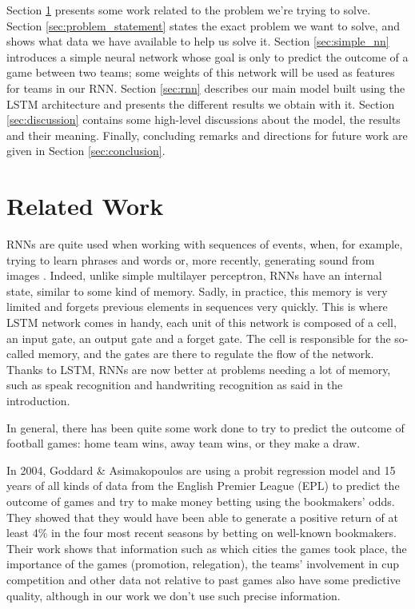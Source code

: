 \documentclass[10pt,conference,onecolumn]{IEEEtran}
\begin{document}
Section \ref{sec:related_work} presents some work related to the problem we're trying to solve. Section \ref{sec:problem_statement} states the exact problem we want to solve, and shows what data we have available to help us solve it. Section \ref{sec:simple_nn} introduces a simple neural network whose goal is only to predict the outcome of a game between two teams; some weights of this network will be used as features for teams in our RNN. Section \ref{sec:rnn} describes our main model built using the LSTM architecture and presents the different results we obtain with it. Section \ref{sec:discussion} contains some high-level discussions about the model, the results and their meaning. Finally, concluding remarks and directions for future work are given in Section \ref{sec:conclusion}.



\section{Related Work} \label{sec:related_work}
RNNs are quite used when working with sequences of events, when, for example, trying to learn phrases and words \cite{DBLP:journals/corr/ChoMGBSB14} or, more recently, generating sound from images \cite{rnn_sound}. Indeed, unlike simple multilayer perceptron, RNNs have an internal state, similar to some kind of memory. Sadly, in practice, this memory is very limited and forgets previous elements in sequences very quickly. This is where LSTM network comes in handy, each unit of this network is composed of a cell, an input gate, an output gate and a forget gate. The cell is responsible for the so-called memory, and the gates are there to regulate the flow of the network. Thanks to LSTM, RNNs are now better at problems needing a lot of memory, such as speak recognition \cite{speech_recognition} and handwriting recognition \cite{NIPS2008/handwriting_recognition} as said in the introduction.

In general, there has been quite some work done to try to predict the outcome of football games: home team wins, away team wins, or they make a draw.

In 2004, Goddard \& Asimakopoulos \cite{goddard} are using a probit regression model and 15 years of all kinds of data from the English Premier League (EPL) to predict the outcome of games and try to make money betting using the bookmakers' odds. They showed that they would have been able to generate a positive return of at least 4\% in the four most recent seasons by betting on well-known bookmakers. Their work shows that information such as which cities the games took place, the importance of the games (promotion, relegation), the teams' involvement in cup competition and other data not relative to past games also have some predictive quality, although in our work we don't use such precise information.
\end{document}

